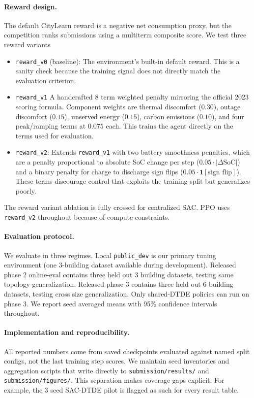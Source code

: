 \documentclass{article}
\begin{document}
\paragraph{Reward design.}
The default CityLearn reward is a negative net consumption proxy, but the competition ranks submissions using a multiterm composite score. We test three reward variants

\begin{itemize}
    \item \texttt{reward\_v0} (baseline): The environment's built-in default reward. This is a sanity check because the training signal does not directly match the evaluation criterion.
    \item \texttt{reward\_v1}  A handcrafted 8 term weighted penalty mirroring the official 2023 scoring formula. Component weights are thermal discomfort ($0.30$), outage discomfort ($0.15$), unserved energy ($0.15$), carbon emissions ($0.10$), and four peak/ramping terms at $0.075$ each. This trains the agent directly on the terms used for evaluation.
    \item \texttt{reward\_v2}: Extends \texttt{reward\_v1} with two battery smoothness penalties, which are a penalty proportional to absolute SoC change per step ($0.05 \cdot |\Delta \text{SoC}|$) and a binary penalty for charge to discharge sign flips ($0.05 \cdot \mathbf{1}[\text{sign flip}]$). These terms discourage control that exploits the training split but generalizes poorly.
\end{itemize}

The reward variant ablation is fully crossed for centralized SAC. PPO uses \texttt{reward\_v2} throughout because of compute constraints.

\paragraph{Evaluation protocol.} We evaluate in three regimes. Local \texttt{public\_dev} is our primary tuning environment (one 3-building dataset available during development). Released phase 2 online-eval contains three held out 3 building datasets, testing same topology generalization. Released phase 3 contains three held out 6 building datasets, testing cross size generalization. Only shared-DTDE policies can run on phase 3. We report seed averaged means with 95\% confidence intervals throughout.

\paragraph{Implementation and reproducibility.} All reported numbers come from saved checkpoints evaluated against named split configs, not the last training step scores. We maintain seed inventories and aggregation scripts that write directly to \texttt{submission/results/} and \texttt{submission/figures/}. This separation makes coverage gaps explicit. For example, the 3 seed SAC-DTDE pilot is flagged as such for every result table.
\end{document}
